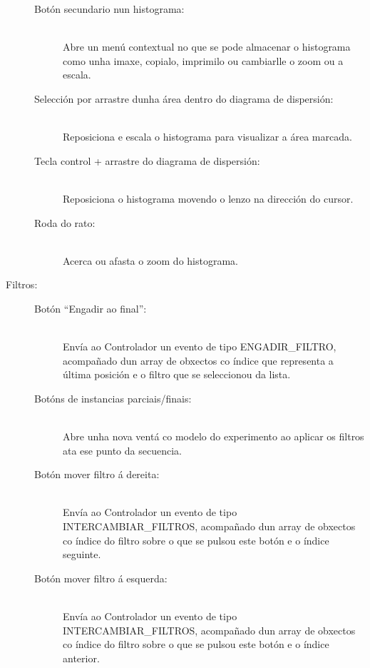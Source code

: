 \begin{description}
\begin{description}
\item[Botón secundario nun histograma:] \hfill \\
Abre un menú contextual no que se pode almacenar o histograma como unha imaxe, copialo, imprimilo ou cambiarlle o zoom ou a escala.

\item[Selección por arrastre dunha área dentro do diagrama de dispersión:] \hfill \\
Reposiciona e escala o histograma para visualizar a área marcada.

\item[Tecla control + arrastre do diagrama de dispersión:] \hfill \\
Reposiciona o histograma movendo o lenzo na dirección do cursor.

\item[Roda do rato:] \hfill \\
Acerca ou afasta o zoom do histograma.

\end{description}

\item[Filtros:] \hfill

\begin{description}

\item[Botón ``Engadir ao final'':] \hfill \\
Envía ao Controlador un evento de tipo ENGADIR\_FILTRO, acompañado dun array de obxectos co índice que representa a última posición e o filtro que se seleccionou da lista.

\item[Botóns de instancias parciais/finais:] \hfill \\
Abre unha nova ventá co modelo do experimento ao aplicar os filtros ata ese punto da secuencia.

\item[Botón mover filtro á dereita:] \hfill \\
Envía ao Controlador un evento de tipo INTERCAMBIAR\_FILTROS, acompañado dun array de obxectos co índice do filtro sobre o que se pulsou este botón e o índice seguinte.

\item[Botón mover filtro á esquerda:] \hfill \\
Envía ao Controlador un evento de tipo INTERCAMBIAR\_FILTROS, acompañado dun array de obxectos co índice do filtro sobre o que se pulsou este botón e o índice anterior.


\end{description}
\end{description}
